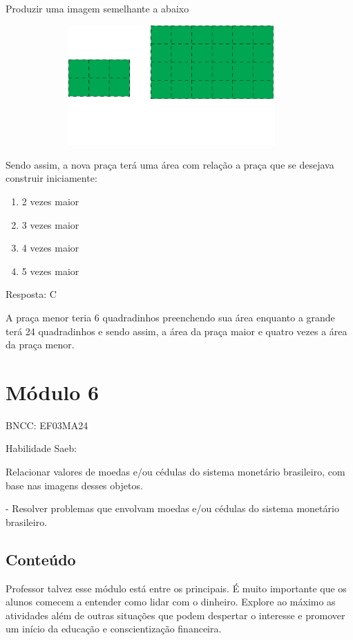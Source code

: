 Produzir uma imagem semelhante a abaixo

\includegraphics[width=5.00877in,height=1.80849in]{media/image63.png}

Sendo assim, a nova praça terá uma área com relação a praça que se
desejava construir iniciamente:

\begin{enumerate}
\def\labelenumi{\alph{enumi})}
\item
  2 vezes maior
\item
  3 vezes maior
\item
  4 vezes maior
\item
  5 vezes maior
\end{enumerate}

Resposta: C

A praça menor teria 6 quadradinhos preenchendo sua área enquanto a
grande terá 24 quadradinhos e sendo assim, a área da praça maior e
quatro vezes a área da praça menor.

\section{Módulo 6}\label{muxf3dulo-6}

BNCC: EF03MA24

Habilidade Saeb:

Relacionar valores de moedas e/ou cédulas do sistema monetário
brasileiro, com base nas imagens desses objetos.

- Resolver problemas que envolvam moedas e/ou cédulas do sistema
monetário brasileiro.

\subsection{Conteúdo}\label{conteuxfado-5}

Professor talvez esse módulo está entre os principais. É muito
importante que os alunos comecem a entender como lidar com o dinheiro.
Explore ao máximo as atividades além de outras situações que podem
despertar o interesse e promover um início da educação e conscientização
financeira.

